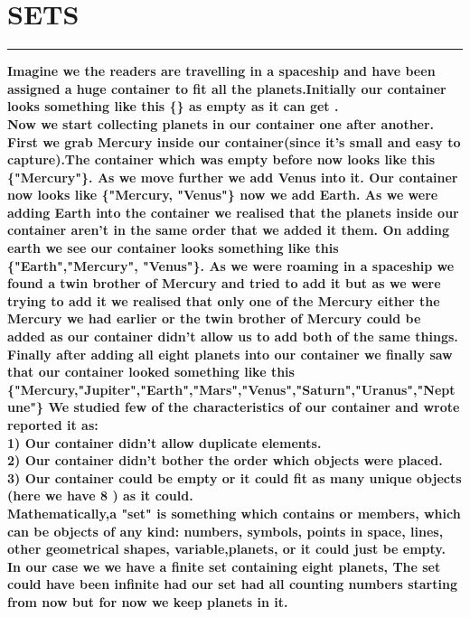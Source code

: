 \documentclass{article}
\begin{document}
\section*{SETS}
\hrule 
\bigskip
\textbf{Imagine we the readers are travelling in a spaceship and  have been assigned a huge container  to fit all the planets.Initially our container looks something like this \{\} as empty as it can get . 
\\
Now we start collecting planets in our container one after another. First we grab Mercury inside our container(since it's small and easy to capture).The container which was empty before now looks like this \{"Mercury"\}. As we move further we add Venus into it. Our container now looks like \{"Mercury, "Venus"\} now we add Earth. 
As we were adding Earth into the container we realised that the planets inside our container aren't in the same order that we added it them. On adding earth we see our container looks something like this \{"Earth","Mercury", "Venus"\}. As we were roaming in a spaceship we found a twin brother of Mercury and tried to add it but as we were trying to add it we realised that only one of the Mercury either the Mercury we had earlier or the twin brother of Mercury could be added as our container didn't allow us to add both of the same things.  Finally after  adding all eight planets into our container we finally saw that our container looked something like this 
\{"Mercury,"Jupiter","Earth","Mars","Venus","Saturn","Uranus","Neptune"\}
We studied few of the characteristics of our container and wrote reported it as:
\\ 1) Our container didn't allow duplicate elements.
\\ 2) Our container didn't bother the order which objects were placed.
\\ 3) Our container could be empty or it could fit as many unique objects (here we have 8 ) as it could.\\Mathematically,a "set" is something which contains or members, which can be  objects of any kind: numbers, symbols, points in space, lines, other geometrical shapes, variable,planets, or it could just be empty. In our case we we have a finite set containing eight planets, The set could have been infinite had our set had all counting numbers starting from now but for now we keep planets in it.}

\pagebreak 
\end{document}
